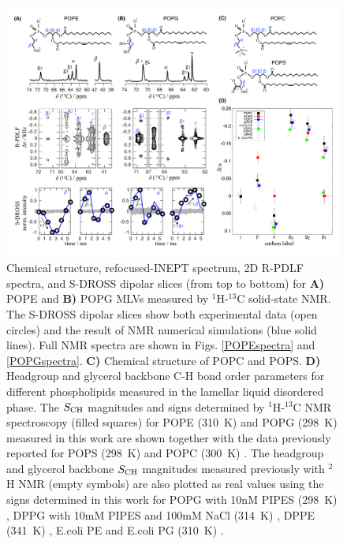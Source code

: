 \documentclass[aps,prl,superscriptaddress,twocolumn]{revtex4}
\begin{document}
\begin{figure}[]
  \centering
   \includegraphics[width=18.0cm]{./Figs/figure1.pdf}
   \caption{\label{HGorderParameters}
     Chemical structure, refocused-INEPT spectrum, 2D R-PDLF spectra, and S-DROSS dipolar slices (from top to bottom) for \textbf{A)} POPE  and \textbf{B)} POPG MLVs measured by $^1$H-$^{13}$C solid-state NMR. The S-DROSS dipolar slices show both experimental data (open circles) and the result of NMR numerical simulations (blue solid lines).
      Full NMR spectra are shown in Figs. \ref{POPEspectra} and \ref{POPGspectra}.
     \textbf{C)} Chemical structure of POPC and POPS.
    \textbf{D)} Headgroup and glycerol backbone C-H bond order parameters for different phospholipids measured in the lamellar liquid disordered phase.
    The $S_{\rm{CH}}$ magnitudes and signs determined by $^1$H-$^{13}$C NMR spectroscopy (filled squares) for POPE (310~K) and POPG (298~K)
    measured in this work are shown together with the data previously reported for POPS (298~K) \cite{antila19} and POPC (300~K) \cite{ferreira13,ferreira16}. The headgroup and glycerol backbone $S_{\rm{CH}}$ magnitudes measured previously with $^2$H NMR (empty symbols) are also plotted as real values using the signs determined in this work for 
    POPG with 10nM PIPES (298~K) \cite{borle85},
    DPPG with 10mM PIPES and 100mM NaCl (314~K) \cite{wohlgemuth80}, 
    DPPE (341~K) \cite{seelig76},
    E.coli PE and E.coli PG (310~K) \cite{gally81}
    .
   }
\end{figure}
\end{document}
